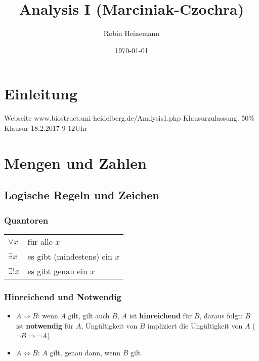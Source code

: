 \documentclass[11pt]{article}
\author{Robin Heinemann}
\date{\today}
\title{Analysis I (Marciniak-Czochra)}
\DeclareMathOperator{\Forall}{\forall}%
\begin{document}
\maketitle
\tableofcontents


\section{Einleitung}
\label{sec-1}
Webseite www.biostruct.uni-heidelberg.de/Analysis1.php
Klausurzulassung: 50\%
Klausur 18.2.2017 9-12Uhr
\section{Mengen und Zahlen}
\label{sec-2}
\subsection{Logische Regeln und Zeichen}
\label{sec-2-1}
\subsubsection{Quantoren}
\label{sec-2-1-1}
\begin{center}
\begin{tabular}{ll}
$\Forall x$ & für alle $x$\\
$\exists x$ & es gibt (mindestens) ein $x$\\
$\exists! x$ & es gibt genau ein $x$\\
\end{tabular}
\end{center}
\subsubsection{Hinreichend und Notwendig}
\label{sec-2-1-2}
\begin{itemize}
\item $A\Rightarrow B$: wenn $A$ gilt, gilt auch $B$, $A$ ist \textbf{hinreichend} für $B$, daraus folgt: $B$ ist \textbf{notwendig} für $A$, Ungültigkeit von $B$ impliziert die Ungültigkeit von $A$ ($\neg B \Rightarrow \neg A$)
\item $A \Leftrightarrow B$: $A$ gilt, genau dann, wenn $B$ gilt
\end{itemize}
\end{document}
